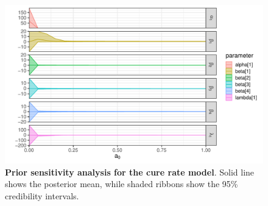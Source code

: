 \documentclass[a4paper, notitlepage, 11pt]{article}
\begin{document}
\begin{figure}[!ht]
\begin{center}
\includegraphics[scale=0.5]{../figures/sensitivity_CureRateRealData.pdf} 
\end{center}
\caption{\textbf{Prior sensitivity analysis for the cure rate model}.
Solid line shows the posterior mean, while shaded ribbons show the 95\% credibility intervals.
}
\label{sfig:cure_rate_sensitivity}
\end{figure}
\end{document}
